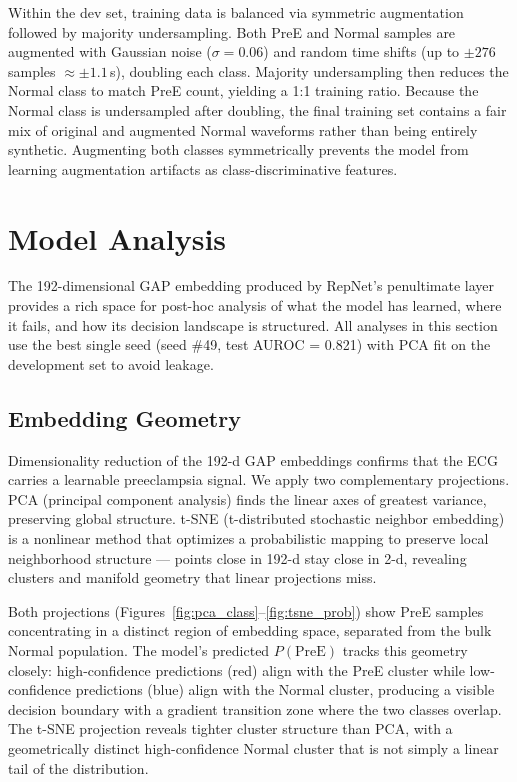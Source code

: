 \documentclass[sigconf,nonacm]{acmart}
\begin{document}
Within the dev set, training data is balanced via symmetric augmentation followed by majority undersampling. Both PreE and Normal samples are augmented with Gaussian noise ($\sigma = 0.06$) and random time shifts (up to $\pm 276$ samples $\approx \pm 1.1$\,s), doubling each class. Majority undersampling then reduces the Normal class to match PreE count, yielding a 1:1 training ratio. Because the Normal class is undersampled after doubling, the final training set contains a fair mix of original and augmented Normal waveforms rather than being entirely synthetic. Augmenting both classes symmetrically prevents the model from learning augmentation artifacts as class-discriminative features.

\section{Model Analysis}

The 192-dimensional GAP embedding produced by RepNet's penultimate layer provides a rich space for post-hoc analysis of what the model has learned, where it fails, and how its decision landscape is structured. All analyses in this section use the best single seed (seed \#49, test AUROC = 0.821) with PCA fit on the development set to avoid leakage.

\subsection{Embedding Geometry}

Dimensionality reduction of the 192-d GAP embeddings confirms that the ECG carries a learnable preeclampsia signal. We apply two complementary projections. PCA (principal component analysis) finds the linear axes of greatest variance, preserving global structure. t-SNE (t-distributed stochastic neighbor embedding) is a nonlinear method that optimizes a probabilistic mapping to preserve local neighborhood structure --- points close in 192-d stay close in 2-d, revealing clusters and manifold geometry that linear projections miss.

Both projections (Figures~\ref{fig:pca_class}--\ref{fig:tsne_prob}) show PreE samples concentrating in a distinct region of embedding space, separated from the bulk Normal population. The model's predicted $P(\text{PreE})$ tracks this geometry closely: high-confidence predictions (red) align with the PreE cluster while low-confidence predictions (blue) align with the Normal cluster, producing a visible decision boundary with a gradient transition zone where the two classes overlap. The t-SNE projection reveals tighter cluster structure than PCA, with a geometrically distinct high-confidence Normal cluster that is not simply a linear tail of the distribution.
\end{document}
